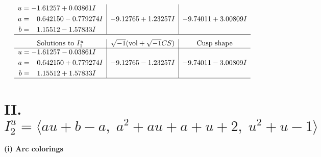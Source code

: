 \documentclass[1p]{elsarticle_modified}
\theoremstyle{definition}
\newcommand{\I}{\sqrt{-1}}
\begin{document}
$$\begin{array}{c|c|c}
\begin{aligned}
u &= -1.61257 + 0.03861 I \\
a &= \phantom{-}0.642150 - 0.779274 I \\
b &= \phantom{-}1.15512 - 1.57833 I\end{aligned}
 & -9.12765 + 1.23257 I & -9.74011 + 3.00809 I\\
 \hline 
 \end{array}$$\newpage$$\begin{array}{c|c|c}  
\text{Solutions to }I^u_{1}& \I (\text{vol} + \sqrt{-1}CS) & \text{Cusp shape}\\
 \hline 
\begin{aligned}
u &= -1.61257 - 0.03861 I \\
a &= \phantom{-}0.642150 + 0.779274 I \\
b &= \phantom{-}1.15512 + 1.57833 I\end{aligned}
 & -9.12765 - 1.23257 I & -9.74011 - 3.00809 I\\
 \hline 
 \end{array}$$\newpage\newpage\renewcommand{\arraystretch}{1}
\centering \section*{II. $I^u_{2}= \langle a u+b- a,\;a^2+a u+a+u+2,\;u^2+u-1 \rangle$}
\flushleft \textbf{(i) Arc colorings}\\
\end{document}
